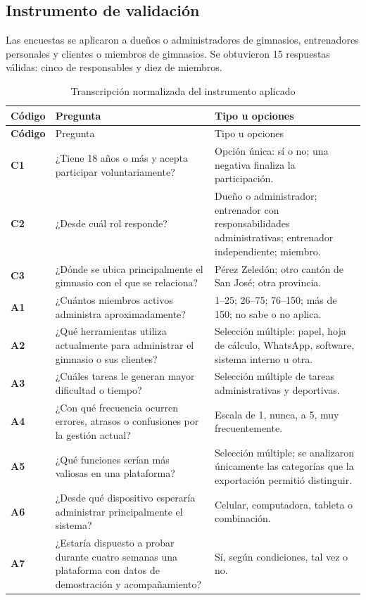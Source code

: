 \subsection{Instrumento de validación}

Las encuestas se aplicaron a dueños o administradores de gimnasios,
entrenadores personales y clientes o miembros de gimnasios. Se obtuvieron
15 respuestas válidas: cinco de responsables y diez de miembros.

\begin{longtable}{>{\bfseries}p{1.5cm}p{8cm}p{4.5cm}}
\caption{Transcripción normalizada del instrumento aplicado}\label{tab:instrumento-resumen}\\
\toprule
Código & Pregunta & Tipo u opciones \\
\midrule
\endfirsthead
\toprule
Código & Pregunta & Tipo u opciones \\
\midrule
\endhead
C1 & ¿Tiene 18 años o más y acepta participar voluntariamente? & Opción única: sí o no; una negativa finaliza la participación. \\
C2 & ¿Desde cuál rol responde? & Dueño o administrador; entrenador con responsabilidades administrativas; entrenador independiente; miembro. \\
C3 & ¿Dónde se ubica principalmente el gimnasio con el que se relaciona? & Pérez Zeledón; otro cantón de San José; otra provincia. \\
A1 & ¿Cuántos miembros activos administra aproximadamente? & 1--25; 26--75; 76--150; más de 150; no sabe o no aplica. \\
A2 & ¿Qué herramientas utiliza actualmente para administrar el gimnasio o sus clientes? & Selección múltiple: papel, hoja de cálculo, WhatsApp, software, sistema interno u otra. \\
A3 & ¿Cuáles tareas le generan mayor dificultad o tiempo? & Selección múltiple de tareas administrativas y deportivas. \\
A4 & ¿Con qué frecuencia ocurren errores, atrasos o confusiones por la gestión actual? & Escala de 1, nunca, a 5, muy frecuentemente. \\
A5 & ¿Qué funciones serían más valiosas en una plataforma? & Selección múltiple; se analizaron únicamente las categorías que la exportación permitió distinguir. \\
A6 & ¿Desde qué dispositivo esperaría administrar principalmente el sistema? & Celular, computadora, tableta o combinación. \\
A7 & ¿Estaría dispuesto a probar durante cuatro semanas una plataforma con datos de demostración y acompañamiento? & Sí, según condiciones, tal vez o no. \\

\end{longtable}
